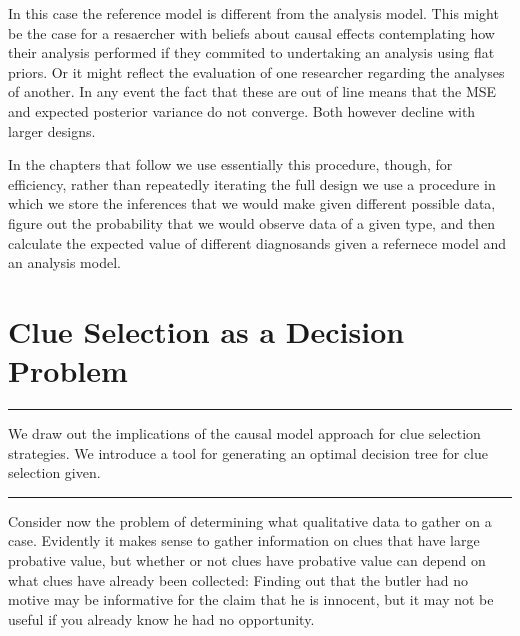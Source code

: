 \documentclass[12pt,]{book}
\begin{document}
In this case the reference model is different from the analysis model. This might be the case for a resaercher with beliefs about causal effects contemplating how their analysis performed if they commited to undertaking an analysis using flat priors. Or it might reflect the evaluation of one researcher regarding the analyses of another. In any event the fact that these are out of line means that the MSE and expected posterior variance do not converge. Both however decline with larger designs.

In the chapters that follow we use essentially this procedure, though, for efficiency, rather than repeatedly iterating the full design we use a procedure in which we store the inferences that we would make given different possible data, figure out the probability that we would observe data of a given type, and then calculate the expected value of different diagnosands given a refernece model and an analysis model.

\hypertarget{clue}{%
\chapter{Clue Selection as a Decision Problem}\label{clue}}

\begin{center}\rule{0.5\linewidth}{\linethickness}\end{center}

We draw out the implications of the causal model approach for clue selection strategies. We introduce a tool for generating an optimal decision tree for clue selection given.

\begin{center}\rule{0.5\linewidth}{\linethickness}\end{center}

Consider now the problem of determining what qualitative data to gather on a case. Evidently it makes sense to gather information on clues that have large probative value, but whether or not clues have probative value can depend on what clues have already been collected: Finding out that the butler had no motive may be informative for the claim that he is innocent, but it may not be useful if you already know he had no opportunity.
\end{document}
